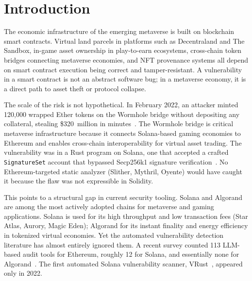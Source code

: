 \documentclass[runningheads]{llncs}
\begin{document}

\section{Introduction}
\label{sec:intro}

The economic infrastructure of the emerging metaverse is built on blockchain
smart contracts.
Virtual land parcels in platforms such as Decentraland and The Sandbox,
in-game asset ownership in play-to-earn ecosystems, cross-chain token bridges
connecting metaverse economies, and NFT provenance systems all depend on
smart contract execution being correct and tamper-resistant.
A vulnerability in a smart contract is not an abstract software bug; in a
metaverse economy, it is a direct path to asset theft or protocol collapse.

The scale of the risk is not hypothetical.
In February 2022, an attacker minted 120{,}000 wrapped Ether tokens on the
Wormhole bridge without depositing any collateral, stealing \$320~million in
minutes~\cite{halborn2022wormhole,certik2022wormhole}.
The Wormhole bridge is critical metaverse infrastructure because it connects
Solana-based gaming economies to Ethereum and enables cross-chain
interoperability for virtual asset trading.
The vulnerability was in a Rust program on Solana, one that accepted a crafted
\texttt{SignatureSet} account that bypassed Secp256k1 signature
verification~\cite{kudelski2022wormhole,immunebytes2022wormhole}.
No Ethereum-targeted static analyzer (Slither, Mythril, Oyente) would have
caught it because the flaw was not expressible in Solidity.

This points to a structural gap in current security tooling.
Solana and Algorand are among the most actively adopted chains for metaverse
and gaming applications. Solana is used for its high throughput and low
transaction fees (Star Atlas, Aurory, Magic Eden); Algorand for its instant
finality and energy efficiency in tokenized virtual economies.
Yet the automated vulnerability detection literature has almost entirely
ignored them.
A recent survey counted 113 LLM-based audit tools for Ethereum, roughly 12 for
Solana, and essentially none for Algorand~\cite{li2025solana}.
The first automated Solana vulnerability scanner, VRust~\cite{cui2022vrust},
appeared only in 2022.
\end{document}
